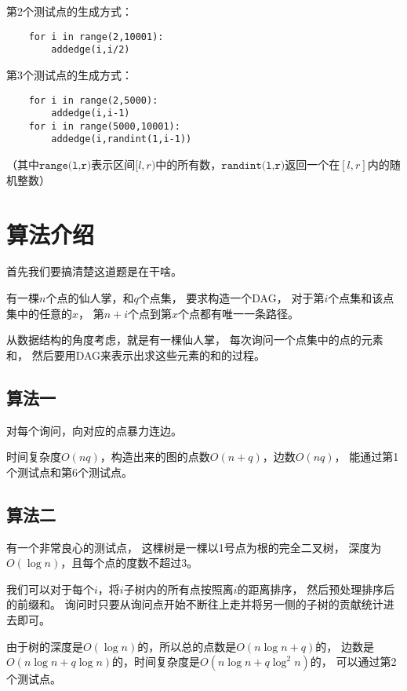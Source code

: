 \documentclass{noiassignment}
\begin{document}
\text{}

第2个测试点的生成方式：
\begin{verbatim}
    for i in range(2,10001):
        addedge(i,i/2)
\end{verbatim}


第3个测试点的生成方式：
\begin{verbatim}
    for i in range(2,5000):
        addedge(i,i-1)
    for i in range(5000,10001):
        addedge(i,randint(1,i-1))
\end{verbatim}

（其中$\texttt{range(l,r)}$表示区间$[l,r)$中的所有数，$\texttt{randint(l,r)}$返回一个在$[l,r]$内的随机整数）


\section{算法介绍}

首先我们要搞清楚这道题是在干啥。

有一棵$n$个点的仙人掌，和$q$个点集，
要求构造一个DAG，
对于第$i$个点集和该点集中的任意的$x$，
第$n+i$个点到第$x$个点都有唯一一条路径。

从数据结构的角度考虑，就是有一棵仙人掌，
每次询问一个点集中的点的元素和，
然后要用DAG来表示出求这些元素的和的过程。



\subsection{算法一}
对每个询问，向对应的点暴力连边。

时间复杂度$O(n q)$，构造出来的图的点数$O(n + q)$，边数$O(n q)$，
能通过第1个测试点和第6个测试点。




\subsection{算法二}
有一个非常良心的测试点，
这棵树是一棵以1号点为根的完全二叉树，
深度为$O(\log n)$，且每个点的度数不超过3。

我们可以对于每个$i$，将$i$子树内的所有点按照离$i$的距离排序，
然后预处理排序后的前缀和。
询问时只要从询问点开始不断往上走并将另一侧的子树的贡献统计进去即可。

由于树的深度是$O(\log n)$的，所以总的点数是$O(n \log n + q)$的，
边数是$O(n \log n + q \log n)$的，时间复杂度是$O(n \log n + q \log ^ 2 n)$的，
可以通过第2个测试点。
\end{document}
